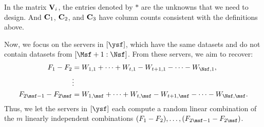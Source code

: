 \documentclass[conference,letterpaper]{IEEEtran}
\begin{document}
In the matrix ${\bf V}_i$, the entries denoted by $*$ are the unknowns that we need to design. And ${\bf C}_1$, ${\bf C}_2$, and ${\bf C}_3$ have column counts consistent with the definitions above.

Now, we focus on the servers in $[\ysf]$, which have the same datasets and do not contain datasets from $[\Msf+1 : \Nsf]$. From these servers, we aim to recover:
\begin{align*}
    F_1 - F_2 &= W_{1,1} + \cdots + W_{t,1} - W_{t+1,1} - \cdots - W_{\Nsf,1}, \\
    &\vdots \\
    F_{2\msf - 1} - F_{2\msf} &= W_{1,\msf} + \cdots + W_{t,\msf} - W_{t+1,\msf} - \cdots - W_{\Nsf,\msf}.
\end{align*}
Thus, we let the servers in $[\ysf]$ each compute a random linear combination of the $m$ linearly independent combinations $(F_1 - F_2), \ldots, (F_{2\msf - 1} - F_{2\msf})$.
\end{document}
